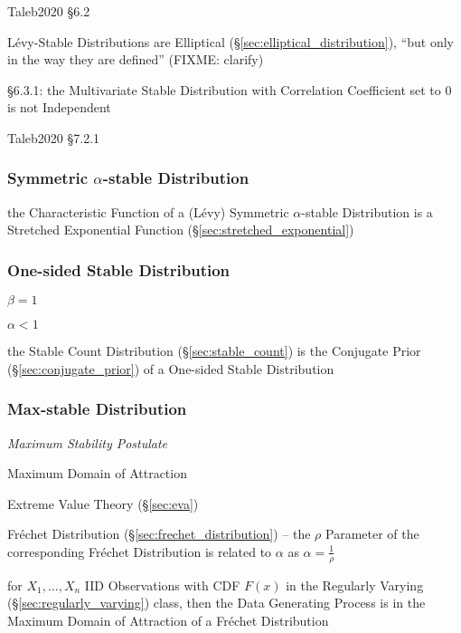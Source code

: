 Taleb2020 \S 6.2

L\'evy-Stable Distributions are Elliptical
(\S\ref{sec:elliptical_distribution}), ``but only in the way they are defined''
(FIXME: clarify)

\S 6.3.1: the Multivariate Stable Distribution with Correlation Coefficient set
to $0$ is not Independent

Taleb2020 \S 7.2.1



\subsubsection{Symmetric $\alpha$-stable Distribution}
\label{sec:symmetric_alpha_stable}

the Characteristic Function of a (L\'evy) Symmetric $\alpha$-stable Distribution
is a Stretched Exponential Function (\S\ref{sec:stretched_exponential})



\subsubsection{One-sided Stable Distribution}\label{sec:onesided_stable}

$\beta = 1$

$\alpha < 1$

the Stable Count Distribution (\S\ref{sec:stable_count}) is the Conjugate Prior
(\S\ref{sec:conjugate_prior}) of a One-sided Stable Distribution



\subsubsection{Max-stable Distribution}\label{sec:max_stable}

\emph{Maximum Stability Postulate}

Maximum Domain of Attraction

\fist Extreme Value Theory (\S\ref{sec:eva})

Fr\'echet Distribution (\S\ref{sec:frechet_distribution}) -- the $\rho$
Parameter of the corresponding Fr\'echet Distribution is related to $\alpha$ as
$\alpha = \frac{1}{\rho}$

for $X_1, \ldots, X_n$ IID Observations with CDF $F(x)$ in the Regularly Varying
(\S\ref{sec:regularly_varying}) class, then the Data Generating Process is in
the Maximum Domain of Attraction of a Fr\'echet Distribution



